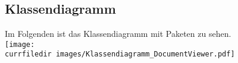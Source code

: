 \begin{samepage}
    \subsection{Klassendiagramm}\label{App_DocumentViewer_Klassendiagramm}
    Im Folgenden ist das Klassendiagramm mit Paketen zu sehen.\\
    \texttt{[image: \\currfiledir images/Klassendiagramm\_DocumentViewer.pdf]}

\end{samepage}